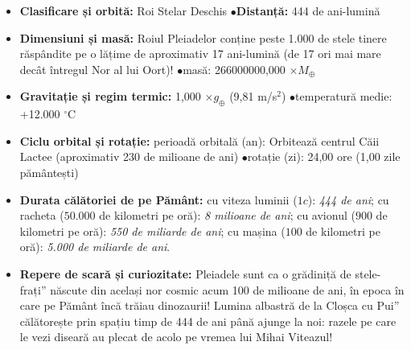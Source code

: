 \begin{tcolorbox}[orbitardata, title={\textbf{Repere esențiale: Roiul Stelar Pleiadele (\quotedblbase{}Cloșca cu Pui\textquotedblright{})}}]
\small
\begin{itemize}[leftmargin=1.4em, itemsep=2pt, topsep=2pt]
  \item \textbf{Clasificare și orbită:} Roi Stelar Deschis \quad$\bullet$\quad \textbf{Distanță:} 444 de ani-lumină
  \item \textbf{Dimensiuni și masă:} Roiul Pleiadelor conține peste 1.000 de stele tinere răspândite pe o lățime de aproximativ 17 ani-lumină (de 17 ori mai mare decât întregul Nor al lui Oort)! \quad$\bullet$\quad masă: 266000000,000 $\times M_\oplus$
  \item \textbf{Gravitație și regim termic:} 1,000 $\times g_\oplus$ (9,81 m/s$^2$) \quad$\bullet$\quad temperatură medie: +12.000 $^\circ$C
  \item \textbf{Ciclu orbital și rotație:} perioadă orbitală (an): Orbitează centrul Căii Lactee (aproximativ 230 de milioane de ani) \quad$\bullet$\quad rotație (zi): 24,00 ore (1,00 zile pământești)
  \item \textbf{Durata călătoriei de pe Pământ:} cu viteza luminii ($1c$): \emph{444 de ani}; cu racheta ($50.000$ de kilometri pe oră): \emph{8 milioane de ani}; cu avionul ($900$ de kilometri pe oră): \emph{550 de miliarde de ani}; cu mașina ($100$ de kilometri pe oră): \emph{5.000 de miliarde de ani}.
  \item \textbf{Repere de scară și curiozitate:} Pleiadele sunt ca o \quotedblbase{}grădiniță de stele-frați\textquotedblright{} născute din același nor cosmic acum 100 de milioane de ani, în epoca în care pe Pământ încă trăiau dinozaurii! Lumina albastră de la \quotedblbase{}Cloșca cu Pui\textquotedblright{} călătorește prin spațiu timp de 444 de ani până ajunge la noi: razele pe care le vezi diseară au plecat de acolo pe vremea lui Mihai Viteazul!
\end{itemize}
\end{tcolorbox}

